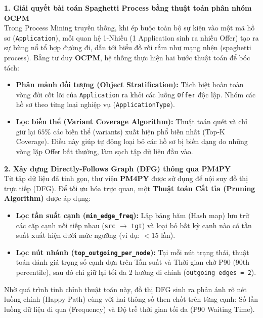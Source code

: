 \documentclass[a4paper,12pt]{article}
\begin{document}
\textbf{1. Giải quyết bài toán Spaghetti Process bằng thuật toán phân nhóm OCPM}\\
Trong Process Mining truyền thống, khi ép buộc toàn bộ sự kiện vào một mã hồ sơ (\texttt{Application}), mối quan hệ 1-Nhiều (1 Application sinh ra nhiều Offer) tạo ra sự bùng nổ tổ hợp đường đi, dẫn tới biểu đồ rối rắm như mạng nhện (spaghetti process). Bằng tư duy \textbf{OCPM}, hệ thống thực hiện hai bước thuật toán để bóc tách:
\begin{itemize}
    \item \textbf{Phân mảnh đối tượng (Object Stratification):} Tách biệt hoàn toàn vòng đời cốt lõi của \texttt{Application} ra khỏi các luồng \texttt{Offer} độc lập. Nhóm các hồ sơ theo từng loại nghiệp vụ (\texttt{ApplicationType}).
    \item \textbf{Lọc biến thể (Variant Coverage Algorithm):} Thuật toán quét và chỉ giữ lại $65\%$ các biến thể (variants) xuất hiện phổ biến nhất (Top-K Coverage). Điều này giúp tự động loại bỏ các hồ sơ bị biến dạng do những vòng lặp Offer bất thường, làm sạch tập dữ liệu đầu vào.
\end{itemize}

\textbf{2. Xây dựng Directly-Follows Graph (DFG) thông qua PM4PY}\\
Từ tập dữ liệu đã tinh gọn, thư viện \textbf{PM4PY} được sử dụng để nội suy đồ thị trực tiếp (DFG). Để tối ưu hóa trực quan, một \textbf{Thuật toán Cắt tỉa (Pruning Algorithm)} được áp dụng:
\begin{itemize}
    \item \textbf{Lọc tần suất cạnh (\texttt{min\_edge\_freq}):} Lập bảng băm (Hash map) lưu trữ các cặp cạnh nối tiếp nhau (\texttt{src} $\rightarrow$ \texttt{tgt}) và loại bỏ bất kỳ cạnh nào có tần suất xuất hiện dưới mức ngưỡng (ví dụ: $< 15$ lần).
    \item \textbf{Lọc nút nhánh (\texttt{top\_outgoing\_per\_node}):} Tại mỗi nút trạng thái, thuật toán đánh giá trọng số cạnh dựa trên Tần suất và Thời gian chờ P90 (90th percentile), sau đó chỉ giữ lại tối đa 2 hướng đi chính (\texttt{outgoing edges = 2}). 
\end{itemize}
Nhờ quá trình tinh chỉnh thuật toán này, đồ thị DFG sinh ra phản ánh rõ nét luồng chính (Happy Path) cùng với hai thông số then chốt trên từng cạnh: Số lần luồng dữ liệu đi qua (Frequency) và Độ trễ thời gian tối đa (P90 Waiting Time).
\end{document}
